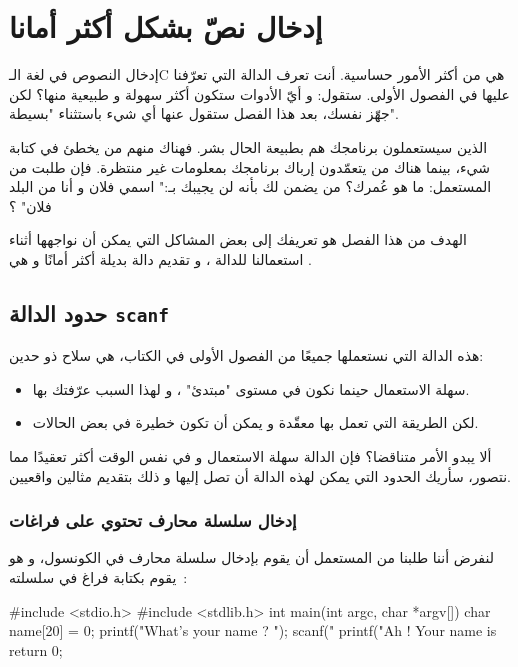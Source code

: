 \chapter{إدخال نصّ بشكل أكثر أمانا}

إدخال النصوص في لغة الـ\textenglish{C}
هي من أكثر الأمور حساسية. أنت تعرف الدالة
التي تعرّفنا عليها في الفصول الأولى. ستقول: و أيّ الأدوات ستكون أكثر سهولة و طبيعية منها؟ لكن جهّز نفسك، بعد هذا الفصل ستقول عنها أي شيء باستثناء "بسيطة".

الذين سيستعملون برنامجك هم بطبيعة الحال بشر. فهناك منهم من يخطئ في كتابة شيء، بينما هناك من يتعمّدون إرباك برنامجك بمعلومات غير منتظرة. فإن طلبت من المستعمل: ما هو عُمرك؟ من يضمن لك بأنه لن يجيبك بـ:" اسمي فلان و أنا من البلد فلان" ؟

الهدف من هذا الفصل هو تعريفك إلى بعض المشاكل التي يمكن أن نواجهها أثناء استعمالنا للدالة
،
و تقديم دالة بديلة أكثر أمانًا و هي
.

\section{حدود الدالة \texttt{scanf}}

هذه الدالة التي نستعملها جميعًا من الفصول الأولى في الكتاب، هي سلاح ذو حدين:

\begin{itemize}
  \item سهلة الاستعمال حينما نكون في مستوى "مبتدئ" ، و لهذا السبب عرّفتك بها.
  \item لكن الطريقة التي تعمل بها معقّدة و يمكن أن تكون خطيرة في بعض الحالات.
\end{itemize}

ألا يبدو الأمر متناقضا؟ فإن الدالة
سهلة الاستعمال و في نفس الوقت أكثر تعقيدًا مما نتصور، سأريك الحدود التي يمكن لهذه الدالة أن تصل إليها و ذلك بتقديم مثالين واقعيين.

\subsection{إدخال سلسلة محارف تحتوي على فراغات }

لنفرض أننا طلبنا من المستعمل أن يقوم بإدخال سلسلة محارف في الكونسول، و هو يقوم بكتابة فراغ في سلسلته~:

\begin{Csource}
#include <stdio.h>
#include <stdlib.h>
int main(int argc, char *argv[])
{
	char name[20] = {0};
	printf("What's your name ? ");
	scanf("%
	printf("Ah ! Your name is %
	return 0;
}
\end{Csource}

